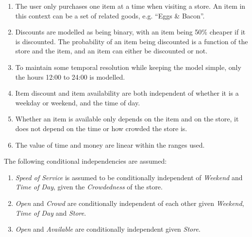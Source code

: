 \begin{enumerate}
\item The user only purchases one item at a time when visiting a store. An item in this context can be a set of related goods, e.g. ``Eggs \& Bacon''.
\item Discounts are modelled as being binary, with an item being 50\% cheaper if it is discounted. The probability of an item being discounted is a function of the store and the item, and an item can either be discounted or not.
\item To maintain some temporal resolution while keeping the model simple, only the hours 12:00 to 24:00 is modelled.
\item Item discount and item availability are both independent of whether it is a weekday or weekend, and the time of day.
\item Whether an item is available only depends on the item and on the store, it does not depend on the time or how crowded the store is.
\item The value of time and money are linear within the ranges used.
\end{enumerate}

The following conditional independencies are assumed:

\begin{enumerate}
\item \textit{Speed of Service} is assumed to be conditionally independent of \textit{Weekend} and \textit{Time of Day}, given the \textit{Crowdedness} of the store.
\item \textit{Open} and \textit{Crowd} are conditionally independent of each other given \textit{Weekend}, \textit{Time of Day} and \textit{Store}.
\item \textit{Open} and \textit{Available} are conditionally independent given 
\textit{Store}.
\end{enumerate}


